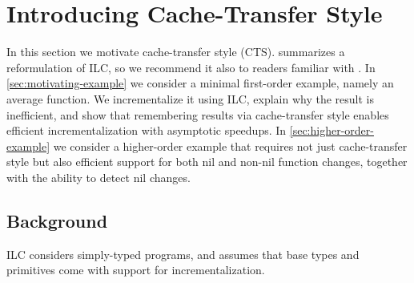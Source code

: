 









\def\deriveDefCore{%
\begin{align*}
  \ensuremath{\Derive{\lambda (\Varid{x}\typcolon\sigma)\to \Varid{t}}} &= \ensuremath{\lambda (\Varid{x}\typcolon\sigma)\;(\Varid{dx}\typcolon\Delta \sigma)\to \Derive{\Varid{t}}} \\
  \ensuremath{\Derive{\Varid{s}\;\Varid{t}}} &= \ensuremath{\Derive{\Varid{s}}\;\Varid{t}\;\Derive{\Varid{t}}} \\
  \ensuremath{\Derive{\Varid{x}}} &= \ensuremath{\Varid{dx}} \\
  \ensuremath{\Derive{\Varid{c}}} &= \ensuremath{\DeriveConst{\Varid{c}}}
\end{align*}
}






\section{Introducing Cache-Transfer Style}
\label{sec:cts-motivation}
In this section we motivate cache-transfer style (CTS).
 summarizes a reformulation of ILC, so we recommend it
also to readers familiar with \citet{CaiEtAl2014ILC}.
In \cref{sec:motivating-example} we consider a minimal first-order example, namely an
average function. We incrementalize it using ILC, explain why the result is
inefficient, and show that remembering results via cache-transfer style enables
efficient incrementalization with asymptotic speedups.
In \cref{sec:higher-order-example} we consider a higher-order example that
requires not just cache-transfer style but also efficient support for both nil
and non-nil function changes, together with the ability to detect nil changes.

\subsection{Background}
\label{sec:ilc-background}
ILC considers simply-typed programs, and assumes that base types and primitives
come with support for incrementalization.

